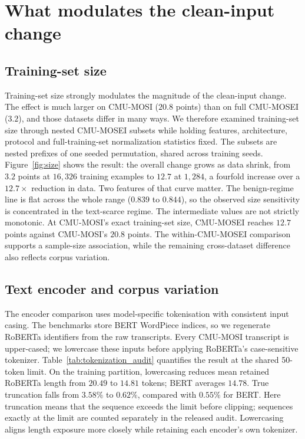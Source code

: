 \documentclass[preprint,11pt]{elsarticle}
\begin{document}
\section{What modulates the clean-input change}\label{sec:modulators}

\subsection{Training-set size}

Training-set size strongly modulates the magnitude of the clean-input change.
The effect is
much larger on CMU-MOSI ($20.8$ points) than on full CMU-MOSEI ($3.2$), and
those datasets differ in many ways. We therefore examined training-set size
through nested CMU-MOSEI subsets while holding features, architecture, protocol and
full-training-set normalization statistics fixed. The subsets are nested
prefixes of one seeded permutation, shared across training seeds.
Figure~\ref{fig:size} shows the result: the overall change grows as data
shrink, from $3.2$ points at
$16{,}326$ training examples to $12.7$ at $1{,}284$, a fourfold increase
over a $12.7\times$ reduction in data. Two features of that curve matter. The
benign-regime line is flat across the whole range ($0.839$ to $0.844$), so
the observed size sensitivity is concentrated in the text-scarce regime.
The intermediate values are not strictly monotonic. At CMU-MOSI's exact
training-set size, CMU-MOSEI reaches $12.7$ points against CMU-MOSI's $20.8$
points. The within-CMU-MOSEI comparison supports a sample-size association,
while the remaining cross-dataset difference also reflects corpus variation.

\subsection{Text encoder and corpus variation}

The encoder comparison uses model-specific tokenisation with consistent
input casing. The benchmarks store BERT WordPiece indices, so we regenerate
RoBERTa identifiers from the raw transcripts. Every CMU-MOSI transcript is
upper-cased; we lowercase these inputs before applying RoBERTa's
case-sensitive tokenizer. Table~\ref{tab:tokenization_audit} quantifies the
result at the shared 50-token limit. On the training partition, lowercasing
reduces mean retained RoBERTa length from $20.49$ to $14.81$ tokens; BERT
averages $14.78$. True truncation falls from $3.58\%$ to $0.62\%$, compared with
$0.55\%$ for BERT. Here truncation means that the sequence exceeds the limit
before clipping; sequences exactly at the limit are counted separately in
the released audit. Lowercasing aligns length exposure more closely while
retaining each encoder's own tokenizer.
\end{document}
